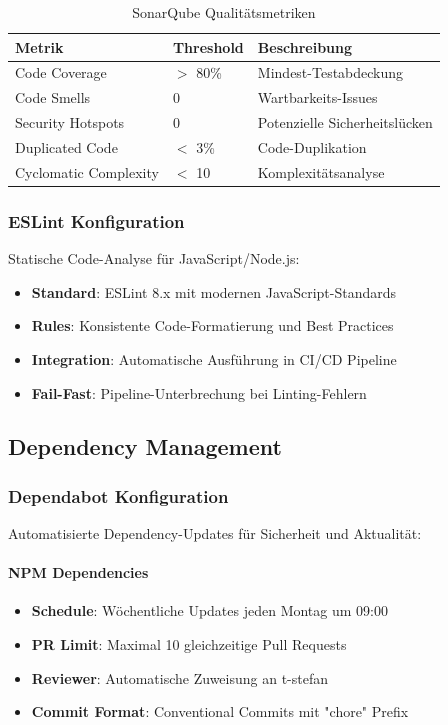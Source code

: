 \begin{table}[h!]
    \centering
    \caption{SonarQube Qualitätsmetriken}
    \label{tab:sonar-metrics}
    \begin{tabular}{|l|l|l|}
    \hline
    \textbf{Metrik} & \textbf{Threshold} & \textbf{Beschreibung} \\ \hline
    Code Coverage & $>$ 80\% & Mindest-Testabdeckung \\ \hline
    Code Smells & 0 & Wartbarkeits-Issues \\ \hline
    Security Hotspots & 0 & Potenzielle Sicherheitslücken \\ \hline
    Duplicated Code & $<$ 3\% & Code-Duplikation \\ \hline
    Cyclomatic Complexity & $<$ 10 & Komplexitätsanalyse \\ \hline
    \end{tabular}
\end{table}

\subsubsection{ESLint Konfiguration}
Statische Code-Analyse für JavaScript/Node.js:
\begin{itemize}
    \item \textbf{Standard}: ESLint 8.x mit modernen JavaScript-Standards
    \item \textbf{Rules}: Konsistente Code-Formatierung und Best Practices
    \item \textbf{Integration}: Automatische Ausführung in CI/CD Pipeline
    \item \textbf{Fail-Fast}: Pipeline-Unterbrechung bei Linting-Fehlern
\end{itemize}

\subsection{Dependency Management}

\subsubsection{Dependabot Konfiguration}
Automatisierte Dependency-Updates für Sicherheit und Aktualität:

\paragraph{NPM Dependencies}
\begin{itemize}
    \item \textbf{Schedule}: Wöchentliche Updates jeden Montag um 09:00
    \item \textbf{PR Limit}: Maximal 10 gleichzeitige Pull Requests
    \item \textbf{Reviewer}: Automatische Zuweisung an t-stefan
    \item \textbf{Commit Format}: Conventional Commits mit "chore" Prefix
\end{itemize}


